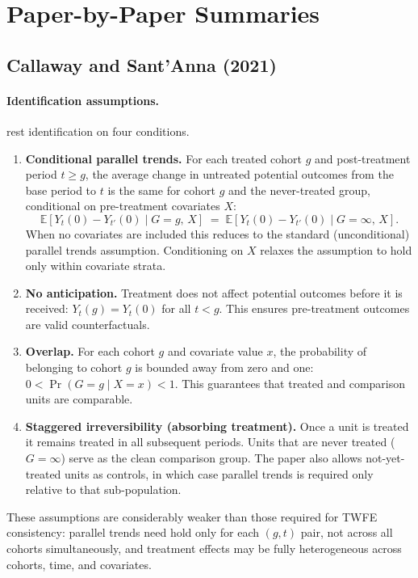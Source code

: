 \documentclass[12pt]{article}
\begin{document}
\section{Paper-by-Paper Summaries}

\subsection{Callaway and Sant'Anna (2021)}

\paragraph{Identification assumptions.}
\citet{callaway2021difference} rest identification on four conditions.
\begin{enumerate}
  \item \textbf{Conditional parallel trends.}
        For each treated cohort $g$ and post-treatment period $t \geq g$,
        the average change in untreated potential outcomes from the base
        period to $t$ is the same for cohort $g$ and the never-treated group,
        conditional on pre-treatment covariates $X$:
        \[
          \mathbb{E}[Y_t(0) - Y_{t'}(0) \mid G = g,\, X]
          \;=\;
          \mathbb{E}[Y_t(0) - Y_{t'}(0) \mid G = \infty,\, X].
        \]
        When no covariates are included this reduces to the standard
        (unconditional) parallel trends assumption.
        Conditioning on $X$ relaxes the assumption to hold only within
        covariate strata.

  \item \textbf{No anticipation.}
        Treatment does not affect potential outcomes before it is received:
        $Y_t(g) = Y_t(0)$ for all $t < g$.
        This ensures pre-treatment outcomes are valid counterfactuals.

  \item \textbf{Overlap.}
        For each cohort $g$ and covariate value $x$, the probability of
        belonging to cohort $g$ is bounded away from zero and one:
        $0 < \Pr(G = g \mid X = x) < 1$.
        This guarantees that treated and comparison units are comparable.

  \item \textbf{Staggered irreversibility (absorbing treatment).}
        Once a unit is treated it remains treated in all subsequent periods.
        Units that are never treated ($G = \infty$) serve as the clean
        comparison group.
        The paper also allows not-yet-treated units as controls, in which
        case parallel trends is required only relative to that sub-population.
\end{enumerate}
These assumptions are considerably weaker than those required for TWFE
consistency: parallel trends need hold only for each $(g, t)$ pair, not
across all cohorts simultaneously, and treatment effects may be fully
heterogeneous across cohorts, time, and covariates.
\end{document}
